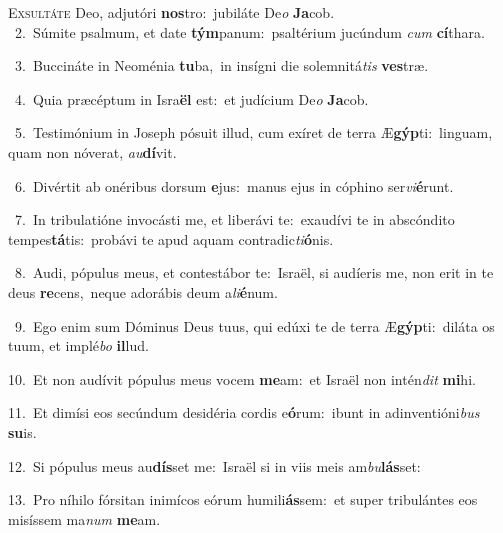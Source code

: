 \lettrine{\initial\textcolor{\initialcolor}{E}}{xsultáte} Deo, adjutóri \textbf{nos}\-tro:~\star jubiláte De\textit{o} \textbf{Ja}\-cob.\\
{\numbfont\textcolor{\numbcolor}{~2.}}~Súmite psalmum, et date \textbf{tým}\-panum:~\star psaltérium jucúndum \textit{cum} \textbf{cí}\-thara.\par
{\numbfont\textcolor{\numbcolor}{~3.}}~Buccináte in Neoménia \textbf{tu}\-ba,~\star in insígni die solemnitá\textit{tis} \textbf{ves}\-træ.\par
{\numbfont\textcolor{\numbcolor}{~4.}}~Quia præcéptum in Isra\textbf{ël} est:~\star et judícium De\textit{o} \textbf{Ja}\-cob.\par
{\numbfont\textcolor{\numbcolor}{~5.}}~Testimónium in Joseph pósuit illud, cum exíret de terra Æ\-\textbf{gýp}\-ti:~\star linguam, quam non nóverat, \textit{au}\-\textbf{dí}vit.\par
{\numbfont\textcolor{\numbcolor}{~6.}}~Divértit ab onéribus dorsum \textbf{e}\-jus:~\star manus ejus in cóphino ser\-\textit{vi}\-\textbf{é}runt.\par
{\numbfont\textcolor{\numbcolor}{~7.}}~In tribulatióne invocásti me, et liberávi te:~\dagger exaudívi te in abscóndito tempes\-\textbf{tá}\-tis:~\star probávi te apud aquam contradic\-\textit{ti}\-\textbf{ó}nis.\par
{\numbfont\textcolor{\numbcolor}{~8.}}~Audi, pópulus meus, et contestábor te:~\dagger Israël, si audíeris me, non erit in te deus \textbf{re}\-cens,~\star neque adorábis deum a\-\textit{li}\-\textbf{é}num.\par
{\numbfont\textcolor{\numbcolor}{~9.}}~Ego enim sum Dóminus Deus tuus, qui edúxi te de terra Æ\-\textbf{gýp}\-ti:~\star diláta os tuum, et implé\textit{bo} \textbf{il}\-lud.\par
{\numbfont\textcolor{\numbcolor}{10.}}~Et non audívit pópulus meus vocem \textbf{me}\-am:~\star et Israël non intén\textit{dit} \textbf{mi}\-hi.\par
{\numbfont\textcolor{\numbcolor}{11.}}~Et dimísi eos secúndum desidéria cordis e\-\textbf{ó}\-rum:~\star ibunt in adinventióni\textit{bus} \textbf{su}\-is.\par
{\numbfont\textcolor{\numbcolor}{12.}}~Si pópulus meus au\-\textbf{dís}\-set me:~\star Israël si in viis meis am\-\textit{bu}\-\textbf{lás}set:\par
{\numbfont\textcolor{\numbcolor}{13.}}~Pro níhilo fórsitan inimícos eórum humili\-\textbf{ás}\-sem:~\star et super tribulántes eos misíssem ma\textit{num} \textbf{me}\-am.\par
